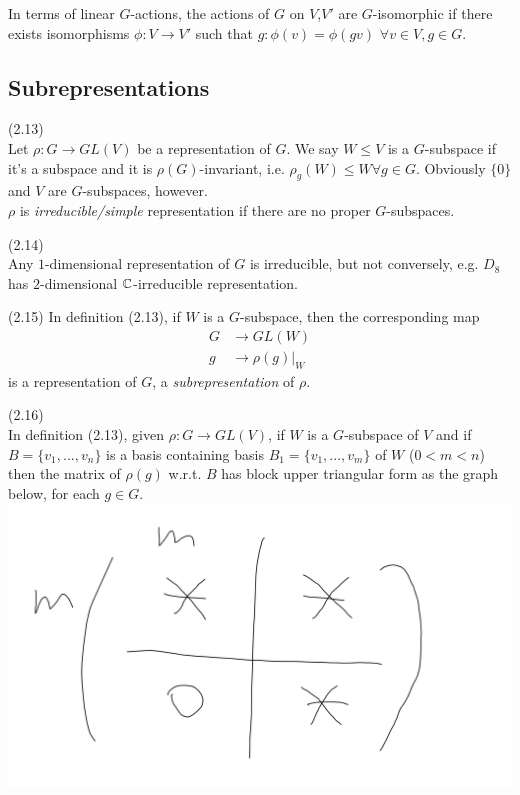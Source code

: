 \documentclass[a4paper]{article}
\begin{document}
In terms of linear $G$-actions, the actions of $G$ on $V$,$V'$ are $G$-isomorphic if there exists isomorphisms $\phi:V \to V'$ such that $g:\phi(v) = \phi(gv)$ $\forall v \in V,g \in G$.

\subsection{Subrepresentations}
\begin{defi} (2.13)\\
Let $\rho:G \to GL(V)$ be a representation of $G$. We say $W \leq V$ is a $G$-subspace if it's a subspace and it is $\rho(G)$-invariant, i.e. $\rho_g(W) \leq W \forall g \in G$. Obviously $\{0\}$ and $V$ are $G$-subspaces, however.\\
$\rho$ is \emph{irreducible/simple} representation if there are no proper $G$-subspaces.
\end{defi}

\begin{eg} (2.14)\\
Any $1$-dimensional representation of $G$ is irreducible, but not conversely, e.g. $D_8$ has $2$-dimensional $\mathbb{C}$-irreducible representation.
\end{eg}

(2.15) In definition (2.13), if $W$ is a $G$-subspace, then the corresponding map
\begin{equation*}
\begin{aligned}
G &\to GL(W)\\
g &\to \rho(g)|_W
\end{aligned}
\end{equation*}
is a representation of $G$, a \emph{subrepresentation} of $\rho$.

\begin{lemma} (2.16)\\
In definition (2.13), given $\rho:G \to GL(V)$, if $W$ is a $G$-subspace of $V$ and if $B=\{v_1,...,v_n\}$ is a basis containing basis $B_1 = \{v_1,...,v_m\}$ of $W$ ($0<m<n$) then the matrix of $\rho(g)$ w.r.t. $B$ has block upper triangular form as the graph below, for each $g \in G$.
\includegraphics[scale=0.5]{image/Rep_03.png}
\end{lemma}
\end{document}
